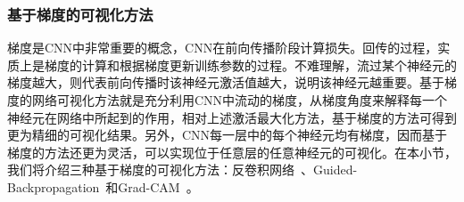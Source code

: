 \subsubsection*{基于梯度的可视化方法}
梯度是CNN中非常重要的概念，CNN在前向传播阶段计算损失。回传的过程，实质上是梯度的计算和根据梯度更新训练参数的过程。不难理解，流过某个神经元的梯度越大，则代表前向传播时该神经元激活值越大，说明该神经元越重要。基于梯度的网络可视化方法就是充分利用CNN中流动的梯度，从梯度角度来解释每一个神经元在网络中所起到的作用，相对上述激活最大化方法，基于梯度的方法可得到更为精细的可视化结果。另外，CNN每一层中的每个神经元均有梯度，因而基于梯度的方法还更为灵活，可以实现位于任意层的任意神经元的可视化。在本小节，我们将介绍三种基于梯度的可视化方法：反卷积网络~\cite{zeiler2010deconvolutional}、Guided-Backpropagation~\cite{springenberg2014striving}和Grad-CAM~\cite{selvaraju2017grad}。

